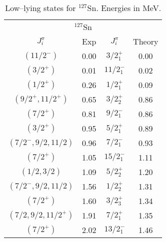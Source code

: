 \begin{table}[htbp]
\begin{center}
\begin{tabular}{cccc}
\hline 
\multicolumn{4}{c}{ $^{127}$Sn} \\ 
{$J^{\pi}_i$} &{Exp} &{$J^{\pi}_i$} &{Theory} \\
\hline 
$(11/2^{-})$         & 0.00 & $3/2^{+}_{1}$  & 0.00 \\
$(3/2^{+})$          & 0.01 & $11/2^{-}_{1}$ & 0.02 \\
$(1/2^{+})$          & 0.26 & $1/2^{+}_{1}$  & 0.09 \\
$(9/2^{+},11/2^{+})$ & 0.65 & $3/2^{+}_{2}$  & 0.86 \\
$(7/2^{+})$          & 0.81 & $9/2^{-}_{1}$  & 0.86 \\
$(3/2^{+})$          & 0.95 & $5/2^{+}_{1}$  & 0.89 \\
$(7/2^{-},9/2,11/2)$ & 0.96 & $7/2^{-}_{1}$  & 0.93 \\
$(7/2^{+})$          & 1.05 & $15/2^{-}_{1}$ & 1.11 \\
$(1/2,3/2)$          & 1.09 & $5/2^{+}_{2}$  & 1.20 \\
$(7/2^{-},9/2,11/2)$ & 1.56 & $1/2^{+}_{2}$  & 1.31 \\
$(7/2^{+})$          & 1.60 & $3/2^{+}_{3}$  & 1.34 \\
$(7/2,9/2,11/2^{+})$ & 1.91 & $7/2^{+}_{1}$  & 1.35 \\
$(7/2^{+})$          & 2.02 & $13/2^{-}_{1}$ & 1.46 \\

\hline 
\end{tabular}
\caption{Low--lying states for  $^{127}$Sn. Energies in MeV.}
\label{tab:127sn}
\end{center}
\end{table}


